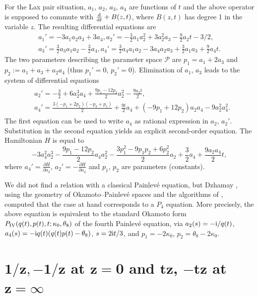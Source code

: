 \documentclass[10pt,a4paper]{amsart}
\numberwithin{equation}{section}
\begin{document}
For the Lax pair situation, $a_1$, $a_2$, $a_3$, $a_4$ are functions of $t$ and the above operator is supposed to commute with $\frac{{\rm d}}{{\rm d}t}+B(z,t)$, where
$B(z,t)$ has degree 1 in the variable $z$. The resulting differential equations are
\begin{gather*}
a_1' = -3a_1a_2a_3 + 3a_4, a_2' = -\frac{3}{2}a_1a_2^2 + 3a_2^2a_3 - \frac{9}{2}a_2t - 3/2,\\
 a_3' = \frac{3}{2}a_3a_1a_2 - \frac{3}{2}a_4, a_4' = \frac{3}{2}a_4a_1a_2 - 3a_4a_2a_3 + \frac{3}{2}a_1a_3 + \frac{9}{2}a_4t.\end{gather*}
The two parameters describing the parameter space
$\mathcal{P}$ are $p_1=a_1+2a_3$ and $p_2:=a_1+a_3+a_2a_4$ (thus $p_1'=0$, $p_2'=0$).
Elimination of $a_1$, $a_3$ leads to the system of differential equations
\begin{gather*}
\begin{split}
&a_2'=-\frac{3}{2}+6a_2^3a_4+\frac{9p_1-12p_2}{2}a_2^2-\frac{9a_2t}{2},\\
& a_4'=\frac{3(-p_1+2p_2)(-p_2+p_1)}{2} +\frac{9t}{2}a_4+(-9p_1+12p_2)a_2a_4-9a_2^2a_4^2.
\end{split}
\end{gather*}
 The first equation can be used to write $a_4$ as rational expression in $a_2$, $a_2'$. Substitution in the second equation yields
 an explicit second-order equation. The Hamiltonian $H$ is equal to
\[-3a_4^2a_2^3-\frac{9p_1-12p_2}{2}a_4a_2^2-\frac{3p_1^2-9p_1p_2+6p_2^2}{2}a_2+\frac{3}{2}a_4+\frac{9a_2a_4}{2}t,\]
 where $a_4'=\frac{\partial H}{\partial a_2}$, $a_2'=-\frac{\partial H}{\partial a_4}$ and $p_1$, $p_2$ are parameters (constants).

 We did not find a relation with a classical Painlev\'e equation, but
 Dzhamay \cite[Section~2]{Dz}, using the geometry of Okamoto--Painlev\'e spaces
 and the algorithms of \cite{D-F-L-S}, computed that the case at hand corresponds to a $P_4$ equation. More precisely, the above equation is equivalent to the standard Okamoto form $P_{\rm IV} (q(t), p(t), t; \kappa_0, \theta_8 ) $ of the fourth Painlev\'e equation,
 via
$a_2(s) = -{\rm i} / q(t)$,
$a_4(s) = - {\rm i} q(t) (q(t) p(t) - \theta_8)$,
$s = 2 {\rm i} t /3$, and $p_1 = - 2 \kappa_0$, $p_2 = \theta_8 - 2 \kappa_0$.

\section[1/z, -1/z at z=0 and tz, -tz at z=infty]{$\boldsymbol{1/z,-1/z}$ at $\boldsymbol{z=0}$ and $\boldsymbol{tz}$, $\boldsymbol{-tz}$ at $\boldsymbol{z=\infty }$}\label{sec11}
\end{document}
